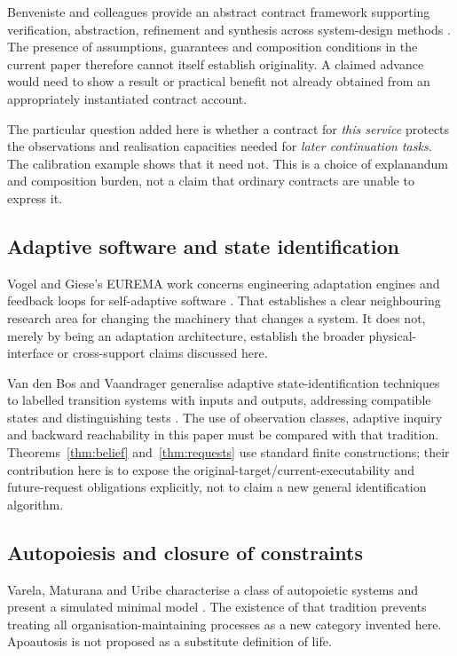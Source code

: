 Benveniste and colleagues provide an abstract contract framework supporting verification, abstraction, refinement and synthesis across system-design methods \cite{CONTRACT}. The presence of assumptions, guarantees and composition conditions in the current paper therefore cannot itself establish originality. A claimed advance would need to show a result or practical benefit not already obtained from an appropriately instantiated contract account.

The particular question added here is whether a contract for \emph{this service} protects the observations and realisation capacities needed for \emph{later continuation tasks}. The calibration example shows that it need not. This is a choice of explanandum and composition burden, not a claim that ordinary contracts are unable to express it.

\subsection{Adaptive software and state identification}

Vogel and Giese's EUREMA work concerns engineering adaptation engines and feedback loops for self-adaptive software \cite{EUREMA}. That establishes a clear neighbouring research area for changing the machinery that changes a system. It does not, merely by being an adaptation architecture, establish the broader physical-interface or cross-support claims discussed here.

Van den Bos and Vaandrager generalise adaptive state-identification techniques to labelled transition systems with inputs and outputs, addressing compatible states and distinguishing tests \cite{ID}. The use of observation classes, adaptive inquiry and backward reachability in this paper must be compared with that tradition. Theorems~\ref{thm:belief} and~\ref{thm:requests} use standard finite constructions; their contribution here is to expose the original-target/current-executability and future-request obligations explicitly, not to claim a new general identification algorithm.

\subsection{Autopoiesis and closure of constraints}

Varela, Maturana and Uribe characterise a class of autopoietic systems and present a simulated minimal model \cite{AUTO}. The existence of that tradition prevents treating all organisation-maintaining processes as a new category invented here. Apoautosis is not proposed as a substitute definition of life.

